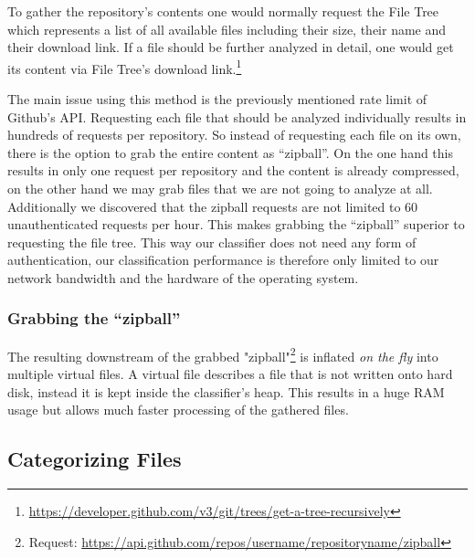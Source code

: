 \documentclass[paper=A4,pagesize=auto,12pt,headinclude=true,footinclude=true,BCOR=0mm,DIV=calc]{scrartcl}
\begin{document}
	To gather the repository’s contents one would normally request the File Tree which represents a list of all available files including their size, their name and their download link. If a file should be further analyzed in detail, one would get its content via File Tree’s download link.\footnote{\url{	https://developer.github.com/v3/git/trees/get-a-tree-recursively}}
	
	The main issue using this method is the previously mentioned rate limit of Github’s API. Requesting each file that should be analyzed individually results in hundreds of requests per repository.
	So instead of requesting each file on its own, there is the option to grab the entire content as “zipball”. On the one hand this results in only one request per repository and the content is already compressed, on the other hand we may grab files that we are not going to analyze at all. 
	Additionally we discovered that the zipball requests are not limited to 60 unauthenticated requests per hour. This makes grabbing the “zipball” superior to requesting the file tree. This way our classifier does not need any form of authentication, our classification performance is therefore only limited to our network bandwidth and the hardware of the operating system.
	
	\subsubsection{ Grabbing the “zipball”}
	
	
	The resulting downstream of the grabbed "zipball"\footnote{Request: \url{https://api.github.com/repos/username/repositoryname/zipball}} is inflated \textit{on the fly }into multiple virtual files. A virtual file describes a file that is not written onto hard disk, instead it is kept inside the classifier’s heap. This results in a huge RAM usage but allows much faster processing of the gathered files.
	
	\subsection{Categorizing Files}
	
\end{document}
